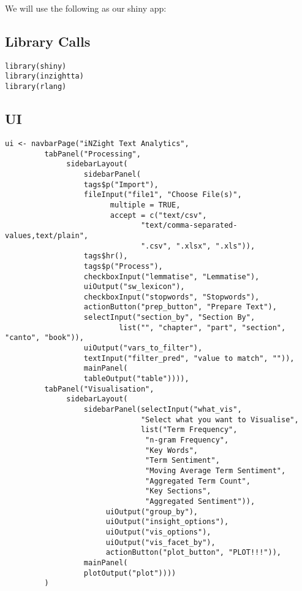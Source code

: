 \documentclass[a4paper, 11pt]{article}
\begin{document}
We will use the following as our shiny app:
\subsection{Library Calls}
\label{sec:org394d5a4}
\begin{verbatim}
library(shiny)
library(inzightta)
library(rlang)
\end{verbatim}
\subsection{UI}
\label{sec:org713466a}
\begin{verbatim}
ui <- navbarPage("iNZight Text Analytics",
		 tabPanel("Processing",
			  sidebarLayout(
			      sidebarPanel(
				  tags$p("Import"),
				  fileInput("file1", "Choose File(s)",
					    multiple = TRUE,
					    accept = c("text/csv",
						       "text/comma-separated-values,text/plain",
						       ".csv", ".xlsx", ".xls")),
				  tags$hr(),
				  tags$p("Process"),
				  checkboxInput("lemmatise", "Lemmatise"),
				  uiOutput("sw_lexicon"),
				  checkboxInput("stopwords", "Stopwords"),
				  actionButton("prep_button", "Prepare Text"),
				  selectInput("section_by", "Section By",
					      list("", "chapter", "part", "section", "canto", "book")),
				  uiOutput("vars_to_filter"),
				  textInput("filter_pred", "value to match", "")),
			      mainPanel(
				  tableOutput("table")))),
		 tabPanel("Visualisation",
			  sidebarLayout(
			      sidebarPanel(selectInput("what_vis",
						       "Select what you want to Visualise",
						       list("Term Frequency",
							    "n-gram Frequency",
							    "Key Words",
							    "Term Sentiment",
							    "Moving Average Term Sentiment",
							    "Aggregated Term Count",
							    "Key Sections",
							    "Aggregated Sentiment")),
					   uiOutput("group_by"),
					   uiOutput("insight_options"),
					   uiOutput("vis_options"),
					   uiOutput("vis_facet_by"),
					   actionButton("plot_button", "PLOT!!!")),
			      mainPanel(
				  plotOutput("plot"))))
		 )
\end{verbatim}
\end{document}
